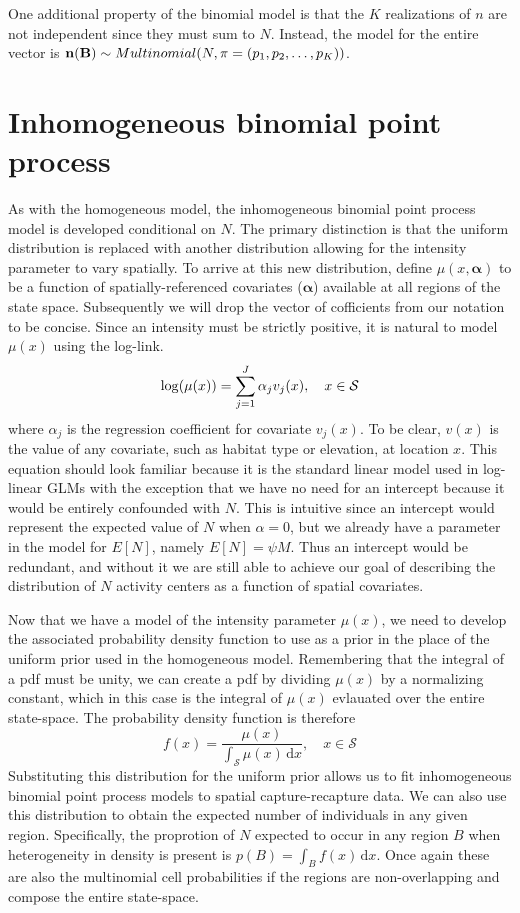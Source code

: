 \documentclass{book}
\begin{document}
One additional property of the binomial model is that the $K$
realizations of $n$ are not independent since they must sum to
$N$. Instead, the model for the entire vector
is ${\bf n(B)} \sim Multinomial(N, {\mathbf{\pi}} = (p_1, p_2, \dots, p_K))$.

\section{Inhomogeneous binomial point process}

As with the homogeneous model, the inhomogeneous binomial point process
model is developed conditional on $N$. The primary distinction is that
the uniform distribution is replaced with another distribution
allowing for the intensity parameter to vary spatially. To arrive at
this new distribution, define $\mu(x,\mathbf{\alpha})$ to be a function of
spatially-referenced covariates ($\mathbf{\alpha}$) available at all regions of the state
space.  Subsequently we will drop the vector of cofficients from our
notation to be concise. Since an intensity must be strictly
positive, it is natural to model $\mu(x)$ using the log-link.
\[
\log(\mu(x)) = \sum_{j=1}^J \alpha_j v_j(x), \quad  x \in \cal{S}
\]
where $\alpha_j$ is the regression coefficient for covariate
$v_j(x)$. To be clear, $v(x)$ is the value of any covariate, such as
habitat type or elevation, at location $x$.  This equation should look
familiar because it is the standard linear model used in log-linear
GLMs with the exception that we have no need
for an intercept because it would be entirely confounded with
$N$. This is intuitive since an intercept would
represent the expected value of $N$ when $\alpha=0$, but we already
have a parameter in the model for $E[N]$, namely $E[N] =
\psi M$. Thus an intercept would be
redundant, and without it we are still able to achieve our goal of
describing the distribution of $N$ activity centers as a function of
spatial covariates.

Now that we have a model of the intensity parameter $\mu(x)$,
we need to develop the associated probability density function to use
as a prior in the place of the uniform prior used in the homogeneous
model. Remembering that
the integral of a pdf must be unity, we can create a pdf by dividing
$\mu(x)$ by a normalizing constant, which in this case is the integral
of $\mu(x)$ evlauated over the entire
state-space. The probability density function is therefore
\begin{equation}
f(x) = \frac{\mu(x)}{\int_{\mathcal{S}} \mu(x)\, \mathrm{d}x}, \quad x \in
\mathcal{S}
\label{eq:pdf-ipp}
\end{equation}
Substituting this distribution for the
uniform prior allows us to fit inhomogeneous binomial point process
models to spatial capture-recapture data. We can also use this
distribution to obtain the expected number of individuals in any given
region. Specifically, the proprotion of $N$ expected to occur in any
region $B$ when heterogeneity in density is present is $p(B) = \int_B
f(x)\, \mathrm{d}x$. Once again these are
also the multinomial cell probabilities if the regions are
non-overlapping and compose the entire state-space.
\end{document}
